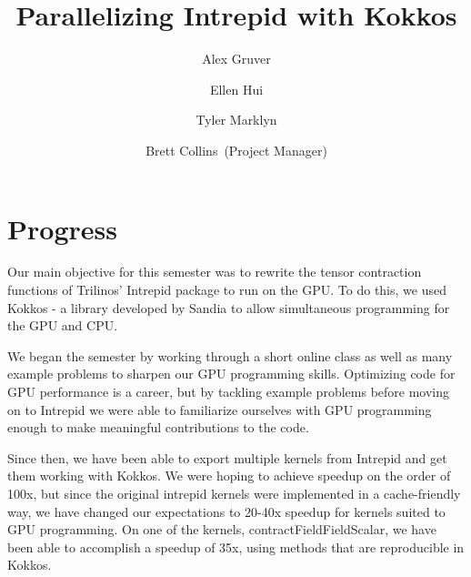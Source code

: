 \documentclass[midyear]{hmcclinic}
\title{Parallelizing Intrepid with Kokkos}
\author{Alex Gruver \and Ellen Hui \and Tyler Marklyn \and Brett Collins~(Project Manager)}
\begin{document}





\maketitle

\mainmatter




\section*{Progress}
Our main objective for this semester was to rewrite the tensor contraction functions of Trilinos' 
Intrepid package to run on the GPU. To do this, we used Kokkos - a library developed by Sandia
to allow simultaneous programming for the GPU and CPU. 

We began the semester by working through a short online class as well as many example
problems to sharpen our GPU programming skills. Optimizing code for GPU
performance is a career, but by tackling example problems before moving on to
Intrepid we were able to familiarize ourselves with GPU programming enough to
make meaningful contributions to the code.

Since then, we have been able to export multiple kernels from Intrepid and get
them working with Kokkos. We were hoping to achieve speedup on the order of 100x, but
since the original intrepid kernels were implemented in a cache-friendly way, we
have changed our expectations to 20-40x speedup for kernels suited to GPU programming. 
On one of the kernels, contractFieldFieldScalar, we have been able to accomplish a speedup
of 35x, using methods that are reproducible in Kokkos. 
\end{document}
